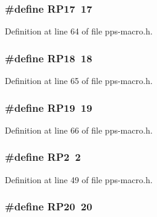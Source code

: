 \subsubsection[{R\+P17}]{\setlength{\rightskip}{0pt plus 5cm}\#define R\+P17~17}\label{pps-macro_8h_a3c2588a9a0c649079896420de528204a}


Definition at line 64 of file pps-\/macro.\+h.

\hypertarget{pps-macro_8h_aec1020eafa8fcf88a2983181205f3458}{}
\subsubsection[{R\+P18}]{\setlength{\rightskip}{0pt plus 5cm}\#define R\+P18~18}\label{pps-macro_8h_aec1020eafa8fcf88a2983181205f3458}


Definition at line 65 of file pps-\/macro.\+h.

\hypertarget{pps-macro_8h_af96ddba7ddf296cae915f9a11234de18}{}
\subsubsection[{R\+P19}]{\setlength{\rightskip}{0pt plus 5cm}\#define R\+P19~19}\label{pps-macro_8h_af96ddba7ddf296cae915f9a11234de18}


Definition at line 66 of file pps-\/macro.\+h.

\hypertarget{pps-macro_8h_ab007f88f5adf1a4132af3c916363550d}{}
\subsubsection[{R\+P2}]{\setlength{\rightskip}{0pt plus 5cm}\#define R\+P2~2}\label{pps-macro_8h_ab007f88f5adf1a4132af3c916363550d}


Definition at line 49 of file pps-\/macro.\+h.

\hypertarget{pps-macro_8h_a8f82f48885aac1ea642e8af8c5519ace}{}
\subsubsection[{R\+P20}]{\setlength{\rightskip}{0pt plus 5cm}\#define R\+P20~20}\label{pps-macro_8h_a8f82f48885aac1ea642e8af8c5519ace}


